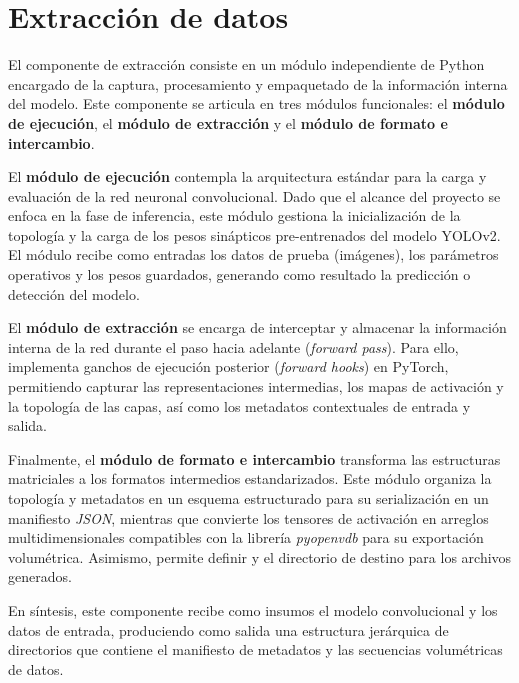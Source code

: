 \section{Extracción de datos}
El componente de extracción consiste en un módulo independiente de Python encargado de la captura, procesamiento y 
empaquetado de la información interna del modelo. Este componente se articula en tres módulos funcionales: el 
\textbf{módulo de ejecución}, el \textbf{módulo de extracción} y el \textbf{módulo de formato e intercambio}.
\medskip

El \textbf{módulo de ejecución} contempla la arquitectura estándar para la carga y evaluación de la red neuronal 
convolucional. Dado que el alcance del proyecto se enfoca en la fase de inferencia, este módulo gestiona la 
inicialización de la topología y la carga de los pesos sinápticos pre-entrenados del modelo YOLOv2. El módulo 
recibe como entradas los datos de prueba (imágenes), los parámetros operativos y los pesos guardados, generando 
como resultado la predicción o detección del modelo.
\medskip

El \textbf{módulo de extracción} se encarga de interceptar y almacenar la información interna de la red durante 
el paso hacia adelante (\textit{forward pass}). Para ello, implementa ganchos de ejecución posterior 
(\textit{forward hooks}) en PyTorch, permitiendo capturar las representaciones intermedias, los mapas de activación 
y la topología de las capas, así como los metadatos contextuales de entrada y salida.
\medskip

Finalmente, el \textbf{módulo de formato e intercambio} transforma las estructuras matriciales a los formatos 
intermedios estandarizados. Este módulo organiza la topología y metadatos en un esquema estructurado para su 
serialización en un manifiesto \textit{JSON}, mientras que convierte los tensores de activación en arreglos 
multidimensionales compatibles con la librería \textit{pyopenvdb} para su exportación volumétrica. Asimismo, 
permite definir y el directorio de destino para los archivos generados.
\medskip

En síntesis, este componente recibe como insumos el modelo convolucional y los datos de entrada, produciendo 
como salida una estructura jerárquica de directorios que contiene el manifiesto de metadatos y las secuencias 
volumétricas de datos.